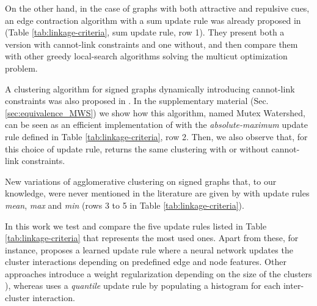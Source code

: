 On the other hand, in the case of graphs with both attractive and repulsive cues, an edge contraction algorithm with a sum update rule was already proposed in \cite{levinkov2017comparative} (Table \ref{tab:linkage-criteria}, sum update rule, row 1). They present both a version with cannot-link constraints and one without, and then compare them with other greedy local-search algorithms solving the multicut optimization problem.

A clustering algorithm for signed graphs dynamically introducing cannot-link constraints was also proposed in \cite{wolf2018mutex}. In the supplementary material (Sec. \ref{sec:equivalence_MWS}) we show how this algorithm, named Mutex Watershed, can be seen as an efficient implementation of \algname{} with the \emph{absolute-maximum} update rule defined in Table \ref{tab:linkage-criteria}, row 2. Then, we also observe that, for this choice of update rule, \algname{} returns the same clustering with or without cannot-link constraints.

New variations of agglomerative clustering on signed graphs that, to our knowledge, were never mentioned in the literature are given by \algname{} with update rules \emph{mean}, \emph{max} and \emph{min} (rows 3 to 5 in Table \ref{tab:linkage-criteria}). 

In this work we test and compare the five update rules listed in Table \ref{tab:linkage-criteria} that represents the most used ones. 
Apart from these, for instance, \cite{nunez2013machine} proposes a learned update rule where a neural network updates the cluster interactions depending on predefined edge and node features. Other approaches introduce a weight regularization depending on the size of the clusters \cite{felzenszwalb2004efficient,kardoostsolving}), whereas 
\cite{funke2018large} uses a \emph{quantile} update rule by populating a histogram for each inter-cluster interaction.

